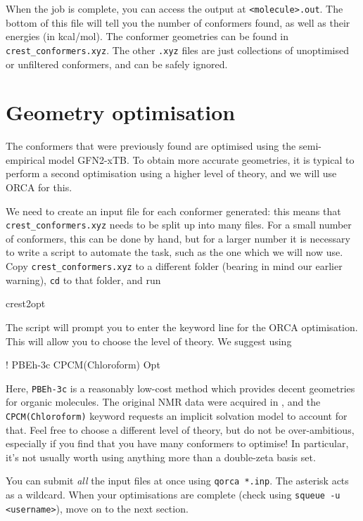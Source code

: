 \documentclass[10pt]{article}
\begin{document}
When the job is complete, you can access the output at \texttt{<molecule>.out}. The bottom of this file will tell you the number of conformers found, as well as their energies (in kcal/mol). The conformer geometries can be found in \texttt{crest\_conformers.xyz}. The other \texttt{.xyz} files are just collections of unoptimised or unfiltered conformers, and can be safely ignored.


\section{Geometry optimisation}

The conformers that were previously found are optimised using the semi-empirical model GFN2-xTB.\autocite{Bannwarth2019} To obtain more accurate geometries, it is typical to perform a second optimisation using a higher level of theory, and we will use ORCA for this.

We need to create an input file for each conformer generated: this means that \texttt{crest\_conformers.xyz} needs to be split up into many files. For a small number of conformers, this can be done by hand, but for a larger number it is necessary to write a script to automate the task, such as the one which we will now use. Copy \texttt{crest\_conformers.xyz} to a different folder (bearing in mind our earlier warning), \texttt{cd} to that folder, and run

\begin{cmdline}
crest2opt
\end{cmdline}

The script will prompt you to enter the keyword line for the ORCA optimisation. This will allow you to choose the level of theory. We suggest using 

\begin{cmdline}
! PBEh-3c CPCM(Chloroform) Opt
\end{cmdline}

Here, \texttt{PBEh-3c} is a reasonably low-cost method which provides decent geometries for organic molecules. The original NMR data\autocite{Sun2013} were acquired in , and the \texttt{CPCM(Chloroform)} keyword requests an implicit solvation model to account for that. Feel free to choose a different level of theory, but do not be over-ambitious, especially if you find that you have many conformers to optimise! In particular, it's not usually worth using anything more than a double-zeta basis set.

You can submit \textit{all} the input files at once using \texttt{qorca *.inp}. The asterisk acts as a wildcard. When your optimisations are complete (check using \texttt{squeue -u <username>}), move on to the next section.
\end{document}

